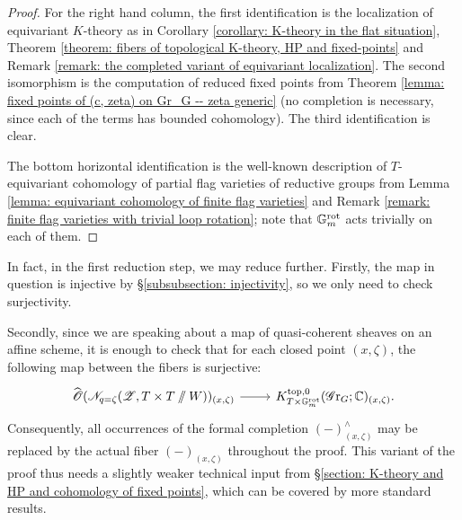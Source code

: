 \begin{proof}
For the right hand column, the first identification is the localization of equivariant $K$-theory as in Corollary \ref{corollary: K-theory in the flat situation}, Theorem \ref{theorem: fibers of topological K-theory, HP and fixed-points} and Remark \ref{remark: the completed variant of equivariant localization}. The second isomorphism is the computation of reduced fixed points from Theorem \ref{lemma: fixed points of (c, zeta) on Gr_G -- zeta generic} (no completion is necessary, since each of the terms has bounded cohomology). The third identification is clear.

The bottom horizontal identification is the well-known description of $T$-equivariant cohomology of partial flag varieties of reductive groups from Lemma \ref{lemma: equivariant cohomology of finite flag varieties} and Remark \ref{remark: finite flag varieties with trivial loop rotation}; note that $\mathbb{G}_m^{\mathrm{rot}}$ acts trivially on each of them.
\end{proof}


\begin{remark}\label{remark: replacing formally completed fibers by actual fibers} 
In fact, in the first reduction step, we may reduce further.
Firstly, the map in question is injective by \S \ref{subsubsection: injectivity}, so we only need to check surjectivity. 

Secondly, since we are speaking about a map of quasi-coherent sheaves on an affine scheme, it is enough to check that for each closed point $(x, \zeta)$, the following map between the fibers is surjective:
\begin{equation*}
    \begin{tikzcd}
        \widehat{\O}(\eN_{q=\zeta}(\eZ, T \times T \sslash W))_{(x, \zeta)} \arrow[r] & K^{\top, 0}_{T \times \Gm^{\rot}}(\Gr_G; \C)_{(x, \zeta)}.
    \end{tikzcd}
\end{equation*}    
Consequently, all occurrences of the formal completion $(-)^{\wedge}_{(x, \zeta)}$ may be replaced by the actual fiber $(-)_{(x, \zeta)}$ throughout the proof. This variant of the proof thus needs a slightly weaker technical input from \S \ref{section: K-theory and HP and cohomology of fixed points}, which can be covered by more standard results.
\end{remark}

